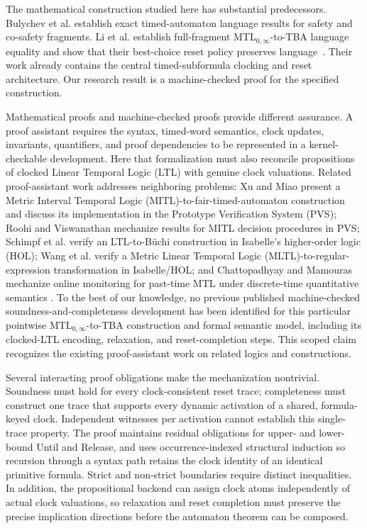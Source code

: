 \documentclass{ieeeaccess}
\begin{document}
The mathematical construction studied here has substantial predecessors.
Bulychev et al. establish exact timed-automaton language results for safety
and co-safety fragments. Li et al. establish full-fragment
MTL$_{0,\infty}$-to-TBA language equality and show that their best-choice
reset policy preserves language~\cite{[BDLG14],li_spin7}. Their
work already contains the central timed-subformula clocking and reset
architecture. Our research result is a machine-checked proof for the specified
construction.

Mathematical proofs and machine-checked proofs provide different assurance.
A proof assistant requires the syntax, timed-word semantics, clock updates,
invariants, quantifiers, and proof dependencies to be represented in a
kernel-checkable development. Here that formalization must also reconcile
propositions of clocked Linear Temporal Logic (LTL) with genuine clock
valuations. Related proof-assistant
work addresses neighboring problems: Xu and Miao present a Metric Interval
Temporal Logic (MITL)-to-fair-timed-automaton construction and discuss its
implementation in the Prototype Verification System (PVS); Roohi and
Viswanathan mechanize results for MITL decision procedures in PVS; Schimpf et
al. verify an LTL-to-B\"uchi construction in Isabelle's higher-order logic
(HOL); Wang et al. verify a
Metric Linear Temporal Logic (MLTL)-to-regular-expression transformation in
Isabelle/HOL; and Chattopadhyay and Mamouras mechanize online monitoring for
past-time MTL under discrete-time quantitative semantics
\cite{xu08,roohi_viswanathan_vmcai18,schimpf_tphols09,
wang_mltl_tacas25,chattopadhyay_mamouras_rv20}. To the best of our knowledge,
no previous published machine-checked soundness-and-completeness development
has been identified for this particular pointwise MTL$_{0,\infty}$-to-TBA
construction and formal semantic model, including its clocked-LTL encoding,
relaxation, and reset-completion steps. This scoped claim recognizes the
existing proof-assistant work on related logics and constructions.

Several interacting proof obligations make the mechanization nontrivial.
Soundness must hold for every clock-consistent reset trace;
completeness must construct one trace that supports every dynamic activation
of a shared, formula-keyed clock. Independent witnesses per activation cannot
establish this single-trace property. The proof maintains residual obligations
for upper- and lower-bound Until and Release, and uses occurrence-indexed
structural induction so recursion through a syntax path retains the clock
identity of an identical primitive formula. Strict and non-strict boundaries
require distinct inequalities. In addition, the propositional backend can
assign clock atoms independently of actual clock valuations, so relaxation
and reset completion must preserve the precise implication directions before
the automaton theorem can be composed.
\end{document}
